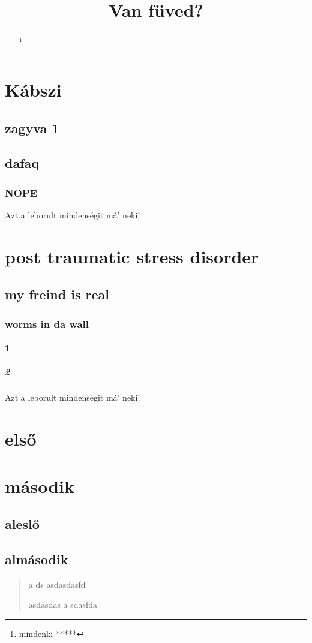 \documentclass[twoside]{article}
\title{Van füved?}
\begin{document}
\maketitle
\begin{abstract}
\texttt{\lipsum[3-4]}
\renewcommand{\thefootnote}{\fnsymbol{footnote}}
\footnote{mindenki *****}
\end{abstract}
\setcounter{secnumdepth}{10}
\setcounter{tocdepth}{10}
\renewcommand{\contentsname}{MI FOLYIK ITT GYÖNGYÖSÖN!?}
\tableofcontents
\clearpage
{}
\section{Kábszi}
\subsection{zagyva 1}
\hulipsum[3]
\subsection{dafaq}
\hulipsum[4]
\subsubsection{NOPE}
\hulipsum[1]
\marginparwidth 3cm
\marginparsep 0.5cm
Azt a leborult mindenségit má' neki!
\section[ptsd]{post traumatic stress disorder}
\subsection{my freind is real}
\subsubsection{worms in da wall}
\paragraph{1}
\subparagraph{2}
\marginparwidth 3cm
\marginparsep 0.5cm
Azt a leborult mindenségit má' neki!
\hulipsum[2]
\quote
\lipsum[5-6]
\quotation
\hulipsum[6-7]
\tableofcontents
\appendix
\section{első}
\section{második}
\subsection{aleslő}
\subsection{almásodik}
\begin{verse}
a
ds
asdasdasfd
\newline

asdasdas
a
sdasfda
\end{verse}
\end{document}
